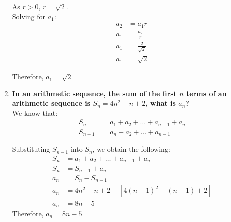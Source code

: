 \documentclass[12pt]{article}
\begin{document}
\begin{enumerate}
    As $r>0$, $r = \sqrt{2}$. \\
    
    Solving for $a_1$:
    \begin{align*}
        a_2 & = a_1r \\
        a_1 & = \frac{a_2}{r} \\
        a_1 & = \frac{2}{\sqrt{2}} \\
        a_1 & = \sqrt{2}
    \end{align*}
    
    Therefore, $a_1 = \sqrt{2}$ \\
    
    \item \textbf{In an arithmetic sequence, the sum of the first $n$ terms of an arithmetic sequence is $S_n = 4n^2 - n + 2$, what is $a_n$?} \\
    
    We know that:
    \begin{align*}
        S_n &= a_1 + a_2 + \dots + a_{n - 1} + a_n \\
        S_{n - 1} &= a_n + a_2 + \dots + a_{n - 1}
    \end{align*}
    
    Substituting $S_{n - 1}$ into $S_n$, we obtain the following:
    \begin{align*}
        S_n & = a_1 + a_2 + \dots + a_{n - 1} + a_n \\
        S_n & = S_{n - 1} + a_n \\
        a_n & = S_n - S_{n - 1} \\
        a_n & = 4n^2 - n + 2 - [4(n - 1)^2 - (n - 1) + 2] \\
        a_n & = 8n - 5
    \end{align*}
    Therefore, $a_n = 8n - 5$
\end{enumerate}

\newpage
\end{document}
